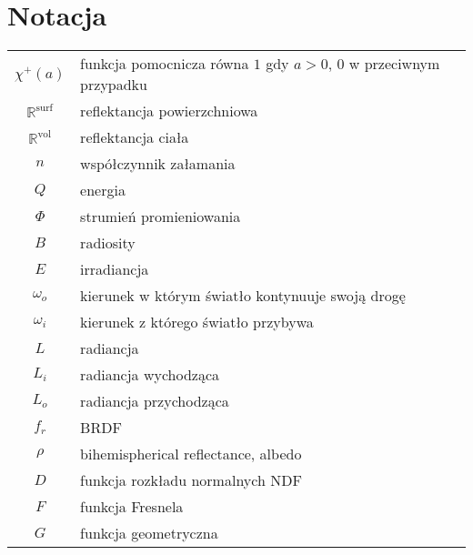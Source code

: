 \documentclass[../main.tex]{subfiles}
\begin{document}
\chapter*{Notacja}

\begin{tabularx}{\textwidth}{cl}
  $\chi^{+}(a)$ 
  & funkcja pomocnicza równa $1$ gdy $a>0$, 0 w przeciwnym przypadku \\
  
  $\mathbb{R}^{\text{surf}}$
  & reflektancja powierzchniowa \\
  
  $\mathbb{R}^{\text{vol}}$
  & reflektancja ciała \\
  
  $n$
  & współczynnik załamania \\
  
  $Q$
  & energia \\
  
  $\Phi$ 
  & strumień promieniowania \\
  
  $B$
  & radiosity \\
  
  $E$
  & irradiancja \\
  
  $\omega_o$
  & kierunek w którym światło kontynuuje swoją drogę \\
  
  $\omega_i$
  & kierunek z którego światło przybywa \\
  
  $L$
  & radiancja \\
  
  $L_i$
  & radiancja wychodząca \\
  
  $L_o$
  & radiancja przychodząca \\
  
  $f_r$
  & BRDF \\
  
  $\rho$ 
  & bihemispherical reflectance, albedo \\
  
  $D$
  & funkcja rozkładu normalnych NDF \\
  
  $F$
  & funkcja Fresnela \\
  
  $G$ 
  & funkcja geometryczna \\  
\end{tabularx}
\end{document}
